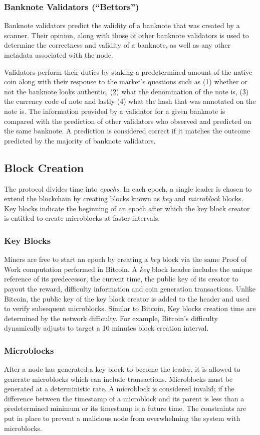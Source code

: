 \subsubsection{Banknote Validators (“Bettors”)}
Banknote validators predict the validity of a banknote that was created by a scanner. Their opinion, along with those of other banknote validators is used to determine the correctness and validity of a banknote, as well as any other metadata associated with the node.

Validators perform their duties by staking a predetermined amount of the native coin along with their response to the market’s questions such as (1) whether or not the banknote looks authentic, (2) what the denomination of the note is, (3) the currency code of note and lastly (4) what the hash that was annotated on the note is. The information provided by a validator for a given banknote is compared with the prediction of other validators who observed and predicted on the same banknote. A prediction is considered correct if it matches the outcome predicted by the majority of banknote validators.


\subsection{Block Creation}
The protocol divides time into \textit{epochs}. In each epoch, a single leader is chosen to extend the blockchain by creating blocks known as \textit{key} and \textit{microblock} blocks. Key blocks indicate the beginning of an epoch after which the key block creator is entitled to create microblocks at faster intervals.

\subsubsection{Key Blocks}
Miners are free to start an epoch by creating a \textit{key} block via the same Proof of Work computation performed in Bitcoin. A \textit{key} block header includes the unique reference of its predecessor, the current time, the public key of its creator to payout the reward, difficulty information and coin generation transactions. Unlike Bitcoin, the public key of the key block creator is added to the header and used to verify subsequent microblocks. Similar to Bitcoin, Key blocks creation time are determined by the network difficulty. For example, Bitcoin’s difficulty dynamically adjusts to target a 10 minutes block creation interval.


\subsubsection{Microblocks}
After a node has generated a key block to become the leader, it is allowed to generate microblocks which can include transactions. Microblocks must be generated at a deterministic rate. A microblock is considered invalid; if the difference between the timestamp of a microblock and its parent is less than a predetermined minimum or its timestamp is a future time. The constraints are put in place to prevent a malicious node from overwhelming the system with microblocks.

